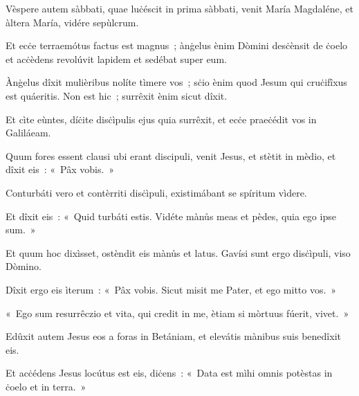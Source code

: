 \mysteryEnd
{}

Vèspere autem sàbbati, quae luċéscit in prima sàbbati, venit María Magdaléne, et àltera María, vidére sepùlcrum. 

Et ecċe terraemótus factus est magnus~; ànġelus ènim Dòmini desċènsit de ċoelo et acċèdens revolúvit lapidem et sedébat super eum. 

Ànġelus dîxit mulièribus nolíte tìmere vos~; sċio ènim quod Jesum qui cruċifîxus est quáeritis. Non est hic~; surrêxit ènim sicut dîxit. 

Et cìte eùntes, díċite disċìpulis ejus quia surrêxit, et ecċe praeċédit vos in Galiláeam. 

Quum fores essent clausi ubi erant discipuli, venit Jesus, et stètit in mèdio, et dîxit eis~: «~Pâx vobis.~» 

Conturbáti vero et contèrriti disċìpuli, existimábant se spíritum vìdere. 

Et dîxit eis~: «~Quid turbáti estis. Vidéte mànůs meas et pèdes, quia ego ipse sum.~» 

Et quum hoc dixìsset, ostèndit eis mànůs et latus. Gavísi sunt ergo disċìpuli, viso Dòmino. 

Dîxit ergo eis ìterum~: «~Pâx vobis. Sicut misit me Pater, et ego mitto vos.~» 

«~Ego sum resurrêczio et vita, qui credit in me, ètiam si mòrtuus fúerit, vivet.~» 

\mysteryEnd
{}

Edûxit autem Jesus eos a foras in Betániam, et elevátis mànibus suis benedîxit eis. 

Et acċédens Jesus locútus est eis, diċens~: «~Data est mìhi omnis potèstas in ċoelo et in terra.~» 

